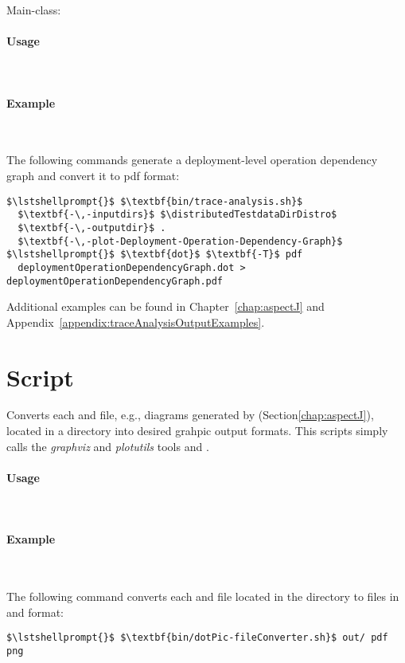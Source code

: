 \noindent Main-class: {\small {}}

\paragraph*{Usage}\

\setTextListing


\paragraph*{Example}\

\noindent The following commands generate a deployment-level operation dependency 
graph and convert it to pdf format:

\setTextListing
\begin{lstlisting}
$\lstshellprompt{}$ $\textbf{bin/trace-analysis.sh}$
  $\textbf{-\,-inputdirs}$ $\distributedTestdataDirDistro$ 
  $\textbf{-\,-outputdir}$ . 
  $\textbf{-\,-plot-Deployment-Operation-Dependency-Graph}$
$\lstshellprompt{}$ $\textbf{dot}$ $\textbf{-T}$ pdf
  deploymentOperationDependencyGraph.dot > deploymentOperationDependencyGraph.pdf
\end{lstlisting}

\noindent Additional examples can be found in Chapter~\ref{chap:aspectJ} and %
Appendix~\ref{appendix:traceAnalysisOutputExamples}.

\section{Script }

Converts each  and  file, e.g., diagrams generated by %
\KiekerTraceAnalysis{} (Section\ref{chap:aspectJ}), located in a directory %
into desired grahpic output formats. %
This scripts simply calls the \textit{graphviz} and \textit{plotutils} tools  and .

\paragraph*{Usage}\

\setTextListing


\paragraph*{Example}\

\noindent The following command converts each  and  file located in the %
directory  to files in  and  format:

\setTextListing
\begin{lstlisting}
$\lstshellprompt{}$ $\textbf{bin/dotPic-fileConverter.sh}$ out/ pdf png
\end{lstlisting}